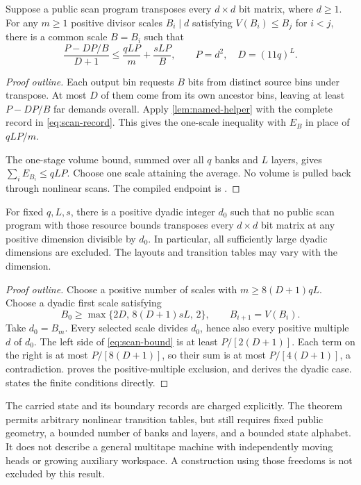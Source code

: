 \begin{theorem}
\label{thm:scan-bound}
Suppose a public scan program transposes every $d\times d$ bit matrix,
where $d\geq1$.
For any $m\geq1$ positive divisor scales $B_i\mid d$ satisfying
$V(B_i)\leq B_j$ for $i<j$, there is a common scale $B=B_i$ such that
\begin{equation}
 \label{eq:scan-bound}
 \frac{P-DP/B}{D+1}
 \leq \frac{qLP}{m}+\frac{sLP}{B},
 \qquad P=d^2,\quad D=(11q)^L.
\end{equation}
\end{theorem}

\begin{proof}[Proof outline]
Each output bin requests $B$ bits from distinct source bins under
transpose. At most $D$ of them come from its own ancestor bins, leaving
at least $P-DP/B$ far demands overall. Apply \cref{lem:named-helper}
with the complete record in \eqref{eq:scan-record}. This gives the
one-scale inequality with $E_B$ in place of $qLP/m$.

The one-stage volume bound, summed over all $q$ banks and $L$ layers,
gives $\sum_i E_{B_i}\leq qLP$. Choose one scale attaining the average.
No volume is pulled back through nonlinear scans. The compiled endpoint
is .
\end{proof}

\begin{corollary}
\label{cor:scan-exclusion}
For fixed $q,L,s$, there is a positive dyadic integer $d_0$ such that
no public scan program with those resource bounds transposes every
$d\times d$ bit matrix at any positive dimension divisible by $d_0$.
In particular, all sufficiently large dyadic dimensions are excluded.
The layouts and transition tables may vary with the dimension.
\end{corollary}

\begin{proof}[Proof outline]
Choose a positive number of scales with
$m\geq 8(D+1)qL$. Choose a dyadic first scale satisfying
\[
 B_0\geq\max\{2D,\,8(D+1)sL,\,2\},
 \qquad B_{i+1}=V(B_i).
\]
Take $d_0=B_m$. Every selected scale divides $d_0$, hence also
every positive multiple $d$ of $d_0$. The left side
of \eqref{eq:scan-bound} is at least $P/[2(D+1)]$. Each term
on the right is at most $P/[8(D+1)]$, so their sum is at most
$P/[4(D+1)]$, a contradiction.
 proves the
positive-multiple exclusion, and
 derives the dyadic
case.  states the
finite conditions directly.
\end{proof}

The carried state and its boundary records are charged explicitly.
The theorem permits arbitrary nonlinear transition tables, but still
requires fixed public geometry, a bounded number of banks and layers,
and a bounded state alphabet. It does not describe a general multitape
machine with independently moving heads or growing auxiliary workspace.
A construction using those freedoms is not excluded by this result.
